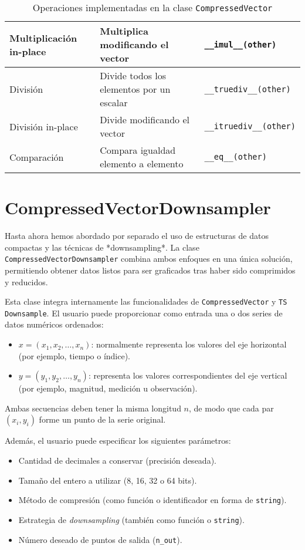 \begin{table}[H]
\begin{tabular}{|p{3.5cm}|p{6cm}|p{5cm}|}
\hline
\rule{0pt}{1.5em}Multiplicación in-place & Multiplica modificando el vector         & \texttt{\_\_imul\_\_(other)} \\
\hline
\rule{0pt}{1.5em}División           & Divide todos los elementos por un escalar      & \texttt{\_\_truediv\_\_(other)} \\
\hline
\rule{0pt}{1.5em}División in-place  & Divide modificando el vector                   & \texttt{\_\_itruediv\_\_(other)} \\
\hline
\rule{0pt}{1.5em}Comparación        & Compara igualdad elemento a elemento           & \texttt{\_\_eq\_\_(other)} \\
\hline
\end{tabular}
\caption{Operaciones implementadas en la clase \texttt{CompressedVector}}
\end{table}

\section{CompressedVectorDownsampler}

Hasta ahora hemos abordado por separado el uso de estructuras de datos compactas y las técnicas de *downsampling*. La clase \texttt{CompressedVectorDownsampler} combina ambos enfoques en una única solución, permitiendo obtener datos listos para ser graficados tras haber sido comprimidos y reducidos.

Esta clase integra internamente las funcionalidades de \texttt{CompressedVector} y \texttt{TS Downsample}. El usuario puede proporcionar como entrada una o dos series de datos numéricos ordenados:

\begin{itemize}
\item $x = (x_1, x_2, \dots, x_n)$: normalmente representa los valores del eje horizontal (por ejemplo, tiempo o índice).
\item $y = (y_1, y_2, \dots, y_n)$: representa los valores correspondientes del eje vertical (por ejemplo, magnitud, medición u observación).
\end{itemize}

Ambas secuencias deben tener la misma longitud $n$, de modo que cada par $(x_i, y_i)$ forme un punto de la serie original.

Además, el usuario puede especificar los siguientes parámetros:

\begin{itemize}
\item Cantidad de decimales a conservar (precisión deseada).
\item Tamaño del entero a utilizar (8, 16, 32 o 64 bits).
\item Método de compresión (como función o identificador en forma de \texttt{string}).
\item Estrategia de \textit{downsampling} (también como función o \texttt{string}).
\item Número deseado de puntos de salida (\texttt{n\_out}).
\end{itemize}


